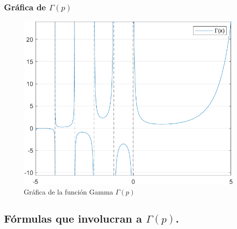 \documentclass[12pt]{beamer}
\begin{document}
\begin{frame}
\frametitle{Gráfica de $\Gamma (p)$}
\begin{figure}[H]
   \centering
   \includegraphics[scale=0.7]{Imagenes/Plot_Gamma.png}
   \caption{Gráfica de la función Gamma $\Gamma (p)$}
   \label{fig:figura_plot_gamma}
\end{figure}
\end{frame}

\subsection{Fórmulas que involucran a \texorpdfstring{$\Gamma (p)$}{G (p)}.}
\end{document}
